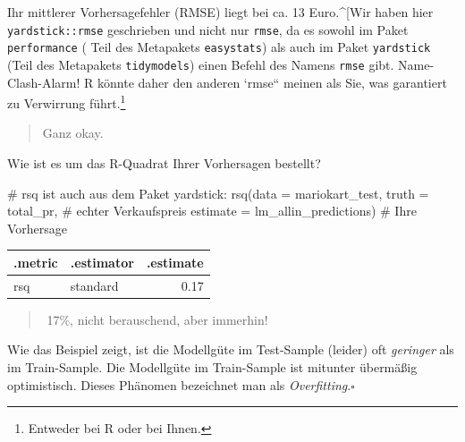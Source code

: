 \documentclass[
  letterpaper,
]{scrbook}
\newenvironment{Shaded}{\begin{snugshade}}{\end{snugshade}}
\newcommand{\AttributeTok}[1]{\textcolor[rgb]{0.40,0.45,0.13}{#1}}
\newcommand{\CommentTok}[1]{\textcolor[rgb]{0.37,0.37,0.37}{#1}}
\newcommand{\FunctionTok}[1]{\textcolor[rgb]{0.28,0.35,0.67}{#1}}
\newcommand{\NormalTok}[1]{\textcolor[rgb]{0.00,0.23,0.31}{#1}}
\theoremstyle{definition}
\theoremstyle{definition}
\theoremstyle{definition}
\theoremstyle{remark}
\begin{document}
Ihr mittlerer Vorhersagefehler (RMSE) liegt bei ca. 13 Euro.\^{}{[}Wir
haben hier \texttt{yardstick::rmse} geschrieben und nicht nur
\texttt{rmse}, da es sowohl im Paket \texttt{performance} ( Teil des
Metapakets \texttt{easystats}) als auch im Paket \texttt{yardstick}
(Teil des Metapakets \texttt{tidymodels}) einen Befehl des Namens
\texttt{rmse} gibt. Name-Clash-Alarm! R könnte daher den anderen `rmse``
meinen als Sie, was garantiert zu Verwirrung führt.\footnote{Entweder
  bei R oder bei Ihnen.}

\begin{quote}
{} Ganz okay.
\end{quote}

Wie ist es um das R-Quadrat Ihrer Vorhersagen bestellt?

\begin{Shaded}
\begin{Highlighting}[]
\CommentTok{\# \textasciigrave{}rsq \textasciigrave{} ist auch aus dem Paket yardstick:}
\FunctionTok{rsq}\NormalTok{(}\AttributeTok{data =}\NormalTok{ mariokart\_test,}
    \AttributeTok{truth =}\NormalTok{ total\_pr,  }\CommentTok{\# echter Verkaufspreis}
    \AttributeTok{estimate =}\NormalTok{ lm\_allin\_predictions)  }\CommentTok{\# Ihre Vorhersage}
\end{Highlighting}
\end{Shaded}

\begin{longtable}[]{@{}llr@{}}
\toprule\noalign{}
.metric & .estimator & .estimate \\
\midrule\noalign{}
\endhead
\bottomrule\noalign{}
\endlastfoot
rsq & standard & 0.17 \\
\end{longtable}

\begin{quote}
{}️ 17\%, nicht berauschend, aber immerhin!
\end{quote}

\begin{tcolorbox}[enhanced jigsaw, colbacktitle=quarto-callout-note-color!10!white, coltitle=black, bottomrule=.15mm, rightrule=.15mm, arc=.35mm, toptitle=1mm, colframe=quarto-callout-note-color-frame, opacitybacktitle=0.6, left=2mm, leftrule=.75mm, breakable, opacityback=0, bottomtitle=1mm, titlerule=0mm, title=\textcolor{quarto-callout-note-color}{\faInfo}\hspace{0.5em}{Modellgüte im Test-Sample meist geringer als im Train-Sample}, colback=white, toprule=.15mm]

Wie das Beispiel zeigt, ist die Modellgüte im Test-Sample (leider) oft
\emph{geringer} als im Train-Sample. Die Modellgüte im Train-Sample ist
mitunter übermäßig optimistisch. Dieses Phänomen bezeichnet man als
\emph{Overfitting}.\(\square\)

\end{tcolorbox}
\end{document}
